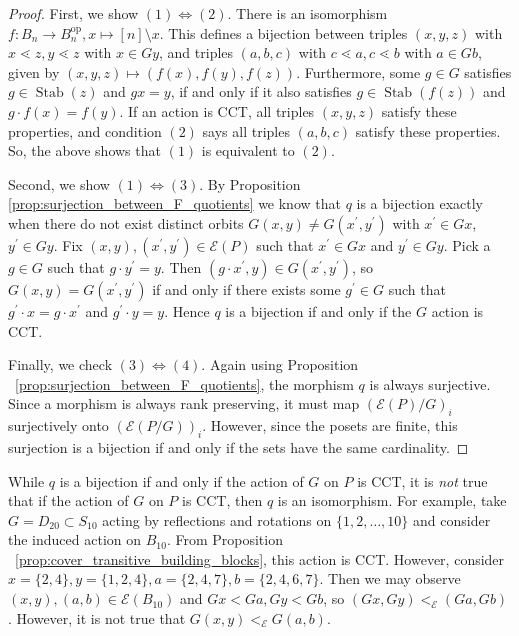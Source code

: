 \documentclass[smallextended, envcountsame, numbook]{svjour3}
\numberwithin{equation}{section}
\renewcommand{\iff}{\Leftrightarrow}
\newcommand\Stab{\operatorname{Stab}}
\newcommand\op{\operatorname{op}}
\begin{document}
\begin{proof}
First, we show $(1) \iff (2)$. There is an isomorphism $f\colon B_n \rightarrow B_n^{\op},x \mapsto [n]\setminus x$. This defines a bijection between triples $(x,y,z)$ with $x \lessdot z,y \lessdot z$ with $x \in Gy$, and triples $(a,b,c)$ with $c \lessdot a, c \lessdot b$ with $a \in Gb$, given by $(x,y,z)\mapsto (f(x),f(y),f(z))$. Furthermore, some $g \in G$ satisfies $g \in \Stab(z)$ and $gx = y$, if and only if it also satisfies $g \in \Stab(f(z))$ and $g\cdot f(x) = f(y)$. If an action is CCT, all triples $(x,y,z)$ satisfy these properties, and condition $(2)$ says all triples $(a,b,c)$ satisfy these properties. So, the above shows that $(1)$ is equivalent to $(2)$.

Second, we show $(1) \iff (3)$. By Proposition \ref{prop:surjection_between_F_quotients} we know that $q$ is a bijection exactly when there do not exist distinct orbits $G(x, y) \ne G(x^\prime, y^\prime)$ with $x^\prime\in Gx$, $y^\prime\in Gy$.  Fix $(x, y), (x^\prime, y^\prime)\in \mathcal E(P)$ such that $x^\prime\in Gx$ and $y^\prime\in Gy$.  Pick a $g\in G$ such that $g\cdot y^\prime = y$.  Then $(g\cdot x^\prime, y)\in G(x^\prime, y^\prime)$, so $G(x, y) = G(x^\prime, y^\prime)$ if and only if there exists some $g^\prime\in G$ such that $g^\prime\cdot x = g\cdot x^\prime$ and $g^\prime\cdot y = y$. Hence $q$ is a bijection if and only if the $G$ action is CCT.

Finally, we check $(3)\iff (4)$. Again using Proposition ~\ref{prop:surjection_between_F_quotients}, the morphism $q$ is always surjective. Since a morphism is always rank preserving, it must map $(\mathcal E(P)/G)_i$ surjectively onto $(\mathcal E(P/G))_i$. However, since the posets are finite, this surjection is a bijection if and only if the sets have the same cardinality.
\end{proof}

\begin{remark}
While $q$ is a bijection if and only if the action of $G$ on $P$ is CCT, it is {\it not} true that if the action of $G$ on $P$ is CCT, then $q$ is an isomorphism.  For example, take $G=D_{20} \subset S_{10}$ acting by reflections and rotations on $\{1,2,\ldots,10\}$ and consider the induced action on $B_{10}$. From Proposition ~\ref{prop:cover_transitive_building_blocks}, this action is CCT. However, consider $x = \{2,4\},y = \{1,2,4\},a = \{2,4,7\},b = \{2,4,6,7\}$. Then we may observe $(x , y),(a, b) \in \mathcal E(B_{10})$ and $Gx < Ga, Gy < Gb$, so $(Gx, Gy) <_{\mathcal E} (Ga, Gb)$. However, it is not true that $G(x, y)<_{\mathcal E} G(a,b)$.
\end{remark}
\end{document}
